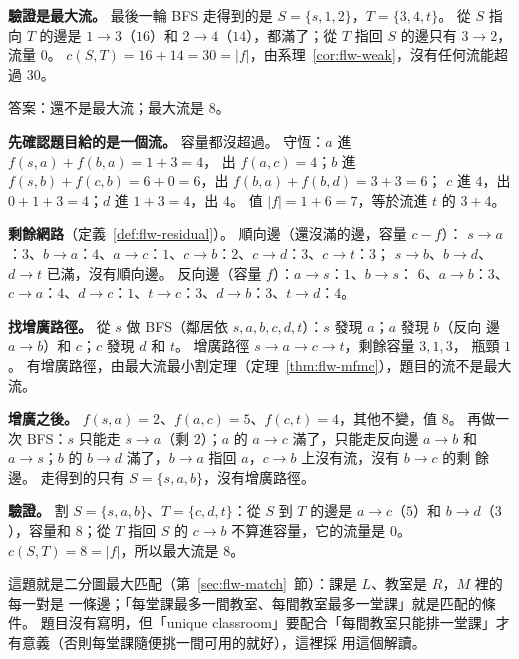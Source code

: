 \textbf{驗證是最大流。} 最後一輪 BFS 走得到的是 $S = \{s, 1, 2\}$，$T = \{3, 4, t\}$。 從 $S$
指向 $T$ 的邊是 $1 \to 3$（$16$）和 $2 \to 4$（$14$），都滿了；從 $T$ 指回 $S$ 的邊只有
$3 \to 2$，流量 $0$。 $c(S, T) = 16 + 14 = 30 = |f|$，由系理~\ref{cor:flw-weak}，沒有任何流能超過
$30$。

答案：還不是最大流；最大流是 $8$。

\textbf{先確認題目給的是一個流。} 容量都沒超過。 守恆：$a$ 進 $f(s, a) + f(b, a) = 1 + 3 = 4$，
出 $f(a, c) = 4$；$b$ 進 $f(s, b) + f(c, b) = 6 + 0 = 6$，出 $f(b, a) + f(b, d) = 3 + 3 = 6$；
$c$ 進 $4$，出 $0 + 1 + 3 = 4$；$d$ 進 $1 + 3 = 4$，出 $4$。 值 $|f| = 1 + 6 = 7$，等於流進 $t$ 的
$3 + 4$。

\textbf{剩餘網路}（定義~\ref{def:flw-residual}）。 順向邊（還沒滿的邊，容量 $c - f$）：
$s \to a$：$3$、$b \to a$：$4$、$a \to c$：$1$、$c \to b$：$2$、$c \to d$：$3$、$c \to t$：$3$；
$s \to b$、$b \to d$、$d \to t$ 已滿，沒有順向邊。 反向邊（容量 $f$）：$a \to s$：$1$、$b \to s$：
$6$、$a \to b$：$3$、$c \to a$：$4$、$d \to c$：$1$、$t \to c$：$3$、$d \to b$：$3$、$t \to d$：$4$。

\textbf{找增廣路徑。} 從 $s$ 做 BFS（鄰居依 $s, a, b, c, d, t$）：$s$ 發現 $a$；$a$ 發現 $b$（反向
邊 $a \to b$）和 $c$；$c$ 發現 $d$ 和 $t$。 增廣路徑 $s \to a \to c \to t$，剩餘容量 $3, 1, 3$，
瓶頸 $1$。 有增廣路徑，由最大流最小割定理（定理~\ref{thm:flw-mfmc}），題目的流不是最大流。

\textbf{增廣之後。} $f(s, a) = 2$、$f(a, c) = 5$、$f(c, t) = 4$，其他不變，值 $8$。 再做一次
BFS：$s$ 只能走 $s \to a$（剩 $2$）；$a$ 的 $a \to c$ 滿了，只能走反向邊 $a \to b$ 和
$a \to s$；$b$ 的 $b \to d$ 滿了，$b \to a$ 指回 $a$，$c \to b$ 上沒有流，沒有 $b \to c$ 的剩
餘邊。 走得到的只有 $S = \{s, a, b\}$，沒有增廣路徑。

\textbf{驗證。} 割 $S = \{s, a, b\}$、$T = \{c, d, t\}$：從 $S$ 到 $T$ 的邊是 $a \to c$（$5$）和
$b \to d$（$3$），容量和 $8$；從 $T$ 指回 $S$ 的 $c \to b$ 不算進容量，它的流量是 $0$。
$c(S, T) = 8 = |f|$，所以最大流是 $8$。

這題就是二分圖最大匹配（第~\ref{sec:flw-match}~節）：課是 $L$、教室是 $R$，$M$ 裡的每一對是
一條邊；「每堂課最多一間教室、每間教室最多一堂課」就是匹配的條件。 題目沒有寫明，但「unique
classroom」要配合「每間教室只能排一堂課」才有意義（否則每堂課隨便挑一間可用的就好），這裡採
用這個解讀。

